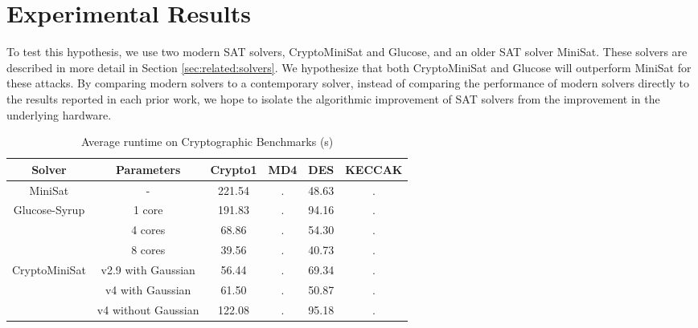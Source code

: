 \section{Experimental Results}
\label{sec:results}


To test this hypothesis, we use two modern SAT solvers, CryptoMiniSat and Glucose, and an older SAT solver MiniSat. These solvers are described in more detail in Section \ref{sec:related:solvers}. 
We hypothesize that both CryptoMiniSat and Glucose will outperform MiniSat for these attacks. By comparing modern solvers to a contemporary solver, instead of comparing the performance of modern solvers directly to the results reported in each prior work, we hope to isolate the algorithmic improvement of SAT solvers from the improvement in the underlying hardware.


\begin{table}[!htbp]
	\centering
	\begin{tabular}{|c|c|c|c|c|c|}
		\hline
		\textbf{Solver} & \textbf{Parameters} & \textbf{Crypto1} & \textbf{MD4} & \textbf{DES} & \textbf{KECCAK} \\
		\hline
		MiniSat & - & 221.54 & . & 48.63 & .\\
		\hline
		\multirow{3}{*}{Glucose-Syrup} & 1 core & 191.83 & . & 94.16 & .\\ \cline{2-3}
		& 4 cores & 68.86 & . & 54.30 & .\\ \cline{2-3}
		& 8 cores & 39.56 & . & 40.73 & .\\
		\hline
		
		\multirow{3}{*}{CryptoMiniSat} & v2.9 with Gaussian & 56.44 & . & 69.34 & . \\ \cline{2-3}
		& v4 with Gaussian & 61.50 & . & 50.87 & . \\ \cline{2-3}
		& v4 without Gaussian & 122.08 & . & 95.18 & .\\
		\hline
	\end{tabular}
	
	\caption{Average runtime on Cryptographic Benchmarks (s)}
	\label{table:crypto1:runtime}
\end{table}